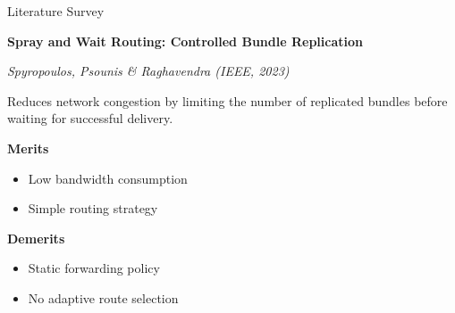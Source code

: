 \documentclass[11pt,aspectratio=43]{beamer}
\begin{document}
\begin{frame}{Literature Survey}

\textbf{Spray and Wait Routing: Controlled Bundle Replication}

\textit{Spyropoulos, Psounis \& Raghavendra (IEEE, 2023)}

\vspace{0.2cm}

Reduces network congestion by limiting the number of replicated bundles before waiting for successful delivery.

\vspace{0.2cm}

\textbf{Merits}
\begin{itemize}
    \item Low bandwidth consumption
    \item Simple routing strategy
\end{itemize}

\textbf{Demerits}
\begin{itemize}
    \item Static forwarding policy
    \item No adaptive route selection
\end{itemize}

\end{frame}
\end{document}
